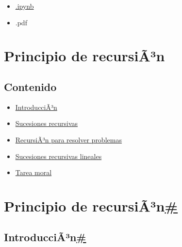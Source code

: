 \label{main-content}
{}

\emph{}

\begin{itemize}
\tightlist
\item
  \href{../_sources/P1/Recursion.ipynb}{{ \emph{} } {.ipynb}}
\item
  { \emph{} } {.pdf}
\end{itemize}

{ \emph{} }

{}

\label{jb-print-docs-body}
\section{Principio de recursiÃ³n}\label{principio-de-recursiuxe3uxb3n}

\label{print-main-content}
\label{jb-print-toc}
\subsection{Contenido}\label{contenido}

\begin{itemize}
\tightlist
\item
  \hyperref[introduccion]{IntroducciÃ³n}
\item
  \hyperref[sucesiones-recursivas]{Sucesiones recursivas}
\item
  \hyperref[recursion-para-resolver-problemas]{RecursiÃ³n para resolver
  problemas}
\item
  \hyperref[sucesiones-recursivas-lineales]{Sucesiones recursivas
  lineales}
\item
  \hyperref[tarea-moral]{Tarea moral}
\end{itemize}

\label{searchbox}

\label{principio-de-recursion}
\section{\texorpdfstring{Principio de
recursiÃ³n\hyperref[principio-de-recursion]{\#}}{Principio de recursiÃ³n\#}}\label{principio-de-recursiuxe3uxb3n-1}

\label{introduccion}
\subsection{\texorpdfstring{IntroducciÃ³n\hyperref[introduccion]{\#}}{IntroducciÃ³n\#}}\label{introducciuxe3uxb3n}

